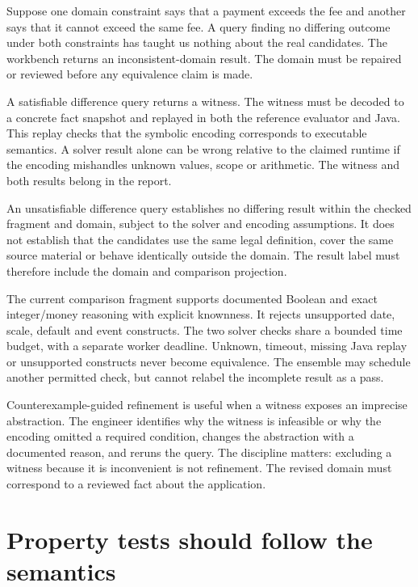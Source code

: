 Suppose one domain constraint says that a payment exceeds the fee and another
says that it cannot exceed the same fee. A query finding no differing outcome
under both constraints has taught us nothing about the real candidates. The
workbench returns an inconsistent-domain result. The domain must be repaired or
reviewed before any equivalence claim is made.

A satisfiable difference query returns a witness. The witness must be decoded to
a concrete fact snapshot and replayed in both the reference evaluator and Java.
This replay checks that the symbolic encoding corresponds to executable semantics.
A solver result alone can be wrong relative to the claimed runtime if the
encoding mishandles unknown values, scope or arithmetic. The witness and both
results belong in the report.


An unsatisfiable difference query establishes no differing result within the
checked fragment and domain, subject to the solver and encoding assumptions. It
does not establish that the candidates use the same legal definition, cover the
same source material or behave identically outside the domain. The result label
must therefore include the domain and comparison projection.

The current comparison fragment supports documented Boolean and exact
integer/money reasoning with explicit knownness. It rejects unsupported date,
scale, default and event constructs. The two solver checks share a bounded time
budget, with a separate worker deadline. Unknown, timeout, missing Java replay or
unsupported constructs never become equivalence. The ensemble may schedule
another permitted check, but cannot relabel the incomplete result as a pass.

Counterexample-guided refinement is useful when a witness exposes an imprecise
abstraction. The engineer identifies why the witness is infeasible or why the
encoding omitted a required condition, changes the abstraction with a documented
reason, and reruns the query. The discipline matters: excluding a witness because
it is inconvenient is not refinement. The revised domain must correspond to a
reviewed fact about the application.

\section{Property tests should follow the semantics}
\label{merge:M07:08}


